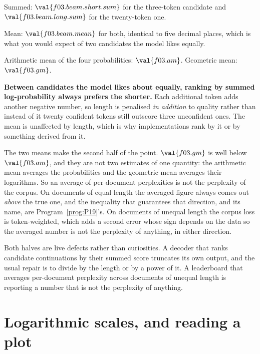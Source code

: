 \begin{fr}
\begin{ansblock}
Summed: $\val{f03.beam.short.sum}$ for the three-token candidate and
$\val{f03.beam.long.sum}$ for the twenty-token one.

Mean: $\val{f03.beam.mean}$ for both, identical to five decimal places, which
is what you would expect of two candidates the model likes equally.

Arithmetic mean of the four probabilities: $\val{f03.am}$. Geometric mean:
$\val{f03.gm}$.
\end{ansblock}

\textbf{Between candidates the model likes about equally, ranking by summed
log-probability always prefers the shorter.} Each additional token adds another
negative number, so length is penalised \emph{in addition} to quality rather
than instead of it \dash{} twenty confident tokens still outscore three
unconfident ones. The mean is unaffected by length, which is why
implementations rank by it or by something derived from it.

The two means make the second half of the point. $\val{f03.gm}$ is well below
$\val{f03.am}$, and they are not two estimates of one quantity: the arithmetic
mean averages the probabilities and the geometric mean averages their
logarithms. So an average of per-document perplexities is not the perplexity of
the corpus. On documents of equal length the averaged figure always comes out
\emph{above} the true one, and the inequality that guarantees that direction,
and its name, are Program~\ref{prog:P19}'s. On documents of unequal length the
corpus loss is token-weighted, which adds a second error whose sign depends on
the data \dash{} so the averaged number is not the perplexity of anything, in
either direction.

\begin{aibox}
Both halves are live defects rather than curiosities. A decoder that ranks
candidate continuations by their summed score truncates its own output, and the
usual repair is to divide by the length or by a power of it. A leaderboard that
averages per-document perplexity across documents of unequal length is
reporting a number that is not the perplexity of anything.
\end{aibox}
\end{fr}

\section{Logarithmic scales, and reading a plot}
\label{sec:F03-scales}

